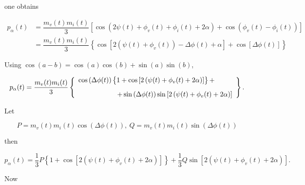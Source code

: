 	\noindent one obtains

\begin{align} p_\alpha(t) &= \dfrac{m_v(t)m_i(t)}{3} \left[ \cos\left(2\psi(t) + \phi_v(t) + \phi_i(t) + 2\alpha\right) + \cos\left(\phi_v(t) - \phi_i(t)\right)\right] \nonumber\\[3mm] &= \dfrac{m_v(t)m_i(t)}{3} \left\{\cos\left[2\left(\psi(t) + \phi_v(t)\right) - \Delta\phi(t) + \alpha\right] + \cos\left[\Delta\phi(t)\right]\right\} \end{align}

	Using $\cos(a-b) = \cos(a)\cos(b) + \sin(a)\sin(b)$,

\begin{equation} p_\alpha(t) = \dfrac{m_v(t)m_i(t)}{3} \left\{ \begin{array}{l} \cos\left(\Delta\phi(t)\right)\left\{\raisebox{3mm}{} 1 + \cos\left[2\left(\psi(t) + \phi_v(t) + 2\alpha\right)\right]\right\} + \\[3mm] \hspace{20mm} +\sin\left(\Delta\phi(t)\right)\sin\left[2\left(\psi(t) + \phi_v(t) + 2\alpha\right)\right] \end{array} \right\} . \label{eq:3p_nonst_complex_apparent_power_eq1} \end{equation}

	Let

\begin{equation} P = m_v(t)m_i(t) \cos\left(\Delta\phi(t)\right),\ Q = m_v(t)m_i(t) \sin\left(\Delta\phi(t)\right) \end{equation}

	\noindent then

\begin{equation} p_\alpha(t) = \dfrac{1}{3}P\left\{1 + \cos\left[2\left(\psi(t) + \phi_v(t) + 2\alpha\right) \right]\right\} + \dfrac{1}{3}Q\sin\left[2\left(\psi(t) + \phi_v(t) + 2\alpha \right)\right] . \label{eq:3p_nonst_complex_apparent_power_eq2} \end{equation}

	Now 

